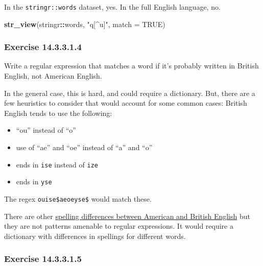 \documentclass[]{book}
\newenvironment{Shaded}{\begin{snugshade}}{\end{snugshade}}
\newcommand{\DataTypeTok}[1]{\textcolor[rgb]{0.13,0.29,0.53}{#1}}
\newcommand{\KeywordTok}[1]{\textcolor[rgb]{0.13,0.29,0.53}{\textbf{#1}}}
\newcommand{\NormalTok}[1]{#1}
\newcommand{\OperatorTok}[1]{\textcolor[rgb]{0.81,0.36,0.00}{\textbf{#1}}}
\newcommand{\OtherTok}[1]{\textcolor[rgb]{0.56,0.35,0.01}{#1}}
\newcommand{\StringTok}[1]{\textcolor[rgb]{0.31,0.60,0.02}{#1}}
\providecommand{\tightlist}{%
  \setlength{\itemsep}{0pt}\setlength{\parskip}{0pt}}
\theoremstyle{plain}
\theoremstyle{remark}
\begin{document}
In the \texttt{stringr::words} dataset, yes. In the full English language, no.

\begin{Shaded}
\begin{Highlighting}[]
\KeywordTok{str_view}\NormalTok{(stringr}\OperatorTok{::}\NormalTok{words, }\StringTok{"q[^u]"}\NormalTok{, }\DataTypeTok{match =} \OtherTok{TRUE}\NormalTok{)}
\end{Highlighting}
\end{Shaded}

\hypertarget{exercise-14.3.3.1.4}{%
\subsubsection*{\texorpdfstring{Exercise {14.3.3.1.4}}{Exercise 14.3.3.1.4}}\label{exercise-14.3.3.1.4}}

Write a regular expression that matches a word if it's probably written in British English, not American English.

In the general case, this is hard, and could require a dictionary.
But, there are a few heuristics to consider that would account for some common cases: British English tends to use the following:

\begin{itemize}
\tightlist
\item
  ``ou'' instead of ``o''
\item
  use of ``ae'' and ``oe'' instead of ``a'' and ``o''
\item
  ends in \texttt{ise} instead of \texttt{ize}
\item
  ends in \texttt{yse}
\end{itemize}

The regex \texttt{ou\textbar{}ise\$\textbar{}ae\textbar{}oe\textbar{}yse\$} would match these.

There are other \href{https://en.wikipedia.org/wiki/American_and_British_English_spelling_differences}{spelling differences between American and British English} but they are not patterns amenable to regular expressions.
It would require a dictionary with differences in spellings for different words.

\hypertarget{exercise-14.3.3.1.5}{%
\subsubsection*{\texorpdfstring{Exercise {14.3.3.1.5}}{Exercise 14.3.3.1.5}}\label{exercise-14.3.3.1.5}}
\end{document}
